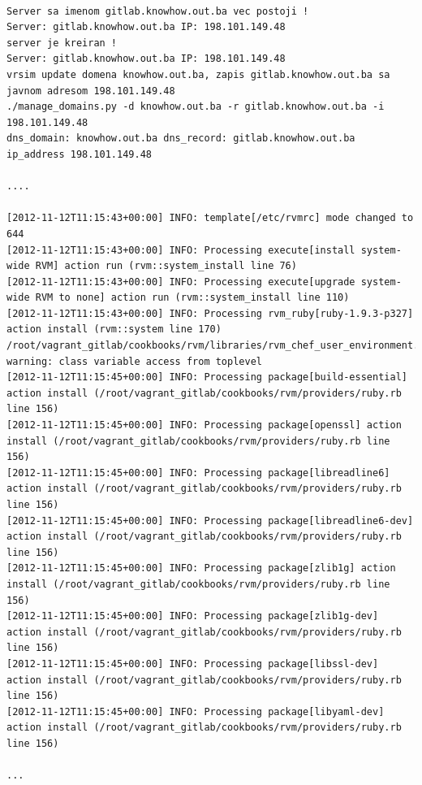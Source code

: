 \documentclass[times, utf8, seminar]{fit}
\begin{document}
\begin{lstlisting}

Server sa imenom gitlab.knowhow.out.ba vec postoji !
Server: gitlab.knowhow.out.ba IP: 198.101.149.48
server je kreiran !
Server: gitlab.knowhow.out.ba IP: 198.101.149.48
vrsim update domena knowhow.out.ba, zapis gitlab.knowhow.out.ba sa javnom adresom 198.101.149.48
./manage_domains.py -d knowhow.out.ba -r gitlab.knowhow.out.ba -i 198.101.149.48
dns_domain: knowhow.out.ba dns_record: gitlab.knowhow.out.ba ip_address 198.101.149.48

....

[2012-11-12T11:15:43+00:00] INFO: template[/etc/rvmrc] mode changed to 644
[2012-11-12T11:15:43+00:00] INFO: Processing execute[install system-wide RVM] action run (rvm::system_install line 76)
[2012-11-12T11:15:43+00:00] INFO: Processing execute[upgrade system-wide RVM to none] action run (rvm::system_install line 110)
[2012-11-12T11:15:43+00:00] INFO: Processing rvm_ruby[ruby-1.9.3-p327] action install (rvm::system line 170)
/root/vagrant_gitlab/cookbooks/rvm/libraries/rvm_chef_user_environment.rb:36: warning: class variable access from toplevel
[2012-11-12T11:15:45+00:00] INFO: Processing package[build-essential] action install (/root/vagrant_gitlab/cookbooks/rvm/providers/ruby.rb line 156)
[2012-11-12T11:15:45+00:00] INFO: Processing package[openssl] action install (/root/vagrant_gitlab/cookbooks/rvm/providers/ruby.rb line 156)
[2012-11-12T11:15:45+00:00] INFO: Processing package[libreadline6] action install (/root/vagrant_gitlab/cookbooks/rvm/providers/ruby.rb line 156)
[2012-11-12T11:15:45+00:00] INFO: Processing package[libreadline6-dev] action install (/root/vagrant_gitlab/cookbooks/rvm/providers/ruby.rb line 156)
[2012-11-12T11:15:45+00:00] INFO: Processing package[zlib1g] action install (/root/vagrant_gitlab/cookbooks/rvm/providers/ruby.rb line 156)
[2012-11-12T11:15:45+00:00] INFO: Processing package[zlib1g-dev] action install (/root/vagrant_gitlab/cookbooks/rvm/providers/ruby.rb line 156)
[2012-11-12T11:15:45+00:00] INFO: Processing package[libssl-dev] action install (/root/vagrant_gitlab/cookbooks/rvm/providers/ruby.rb line 156)
[2012-11-12T11:15:45+00:00] INFO: Processing package[libyaml-dev] action install (/root/vagrant_gitlab/cookbooks/rvm/providers/ruby.rb line 156)

...


\end{lstlisting}
\end{document}

